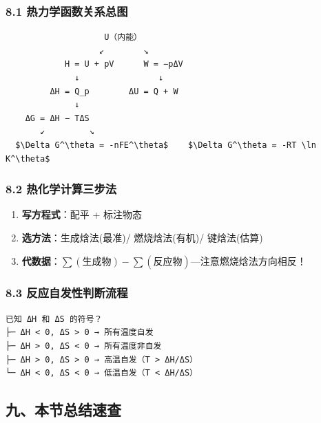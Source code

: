 \documentclass[a4paper,11pt]{ctexart}
\providecommand{\tightlist}{\setlength{\itemsep}{0pt}\setlength{\parskip}{0pt}}
\newcommand{\箭}{\ensuremath{\rightarrow}}
\newcommand{\左箭}{\ensuremath{\leftarrow}}
\newcommand{\上箭}{\ensuremath{\uparrow}}
\newcommand{\下箭}{\ensuremath{\downarrow}}
\newcommand{\衡}{\ensuremath{\rightleftharpoons}}
\newcommand{\双箭}{\ensuremath{\leftrightarrow}}
\newcommand{\约等于}{\ensuremath{\approx}}
\newcommand{\小于等于}{\ensuremath{\leq}}
\newcommand{\大于等于}{\ensuremath{\geq}}
\newcommand{\不等于}{\ensuremath{\neq}}
\newcommand{\西格马}{\ensuremath{\sigma}}
\newcommand{\派}{\ensuremath{\pi}}
\begin{document}
\subsubsection{8.1 热力学函数关系总图}\label{ux70edux529bux5b66ux51fdux6570ux5173ux7cfbux603bux56fe}

\begin{verbatim}
                    U（内能）
                   ↙        ↘
            H = U + pV      W = −pΔV
              ↓                ↓
         ΔH = Q_p        ΔU = Q + W
              ↓
    ΔG = ΔH − TΔS
       ↙         ↘
  $\Delta G^\theta = -nFE^\theta$    $\Delta G^\theta = -RT \ln K^\theta$
\end{verbatim}

\subsubsection{8.2 热化学计算三步法}\label{ux70edux5316ux5b66ux8ba1ux7b97ux4e09ux6b65ux6cd5}

\begin{enumerate}
\def\labelenumi{\arabic{enumi}.}
\tightlist
\item
  \textbf{写方程式}：配平 + 标注物态
\item
  \textbf{选方法}：生成焓法(最准)/ 燃烧焓法(有机)/ 键焓法(估算)
\item
  \textbf{代数据}：\(\sum(\text{生成物}) - \sum(\text{反应物})\)---注意燃烧焓法方向相反！
\end{enumerate}

\subsubsection{8.3 反应自发性判断流程}\label{ux53cdux5e94ux81eaux53d1ux6027ux5224ux65adux6d41ux7a0b}

\begin{verbatim}
已知 ΔH 和 ΔS 的符号？
├─ ΔH < 0, ΔS > 0 → 所有温度自发
├─ ΔH > 0, ΔS < 0 → 所有温度非自发
├─ ΔH > 0, ΔS > 0 → 高温自发（T > ΔH/ΔS）
└─ ΔH < 0, ΔS < 0 → 低温自发（T < ΔH/ΔS）
\end{verbatim}

\subsection{九、本节总结速查}\label{ux4e5dux672cux8282ux603bux7ed3ux901fux67e5}
\end{document}

